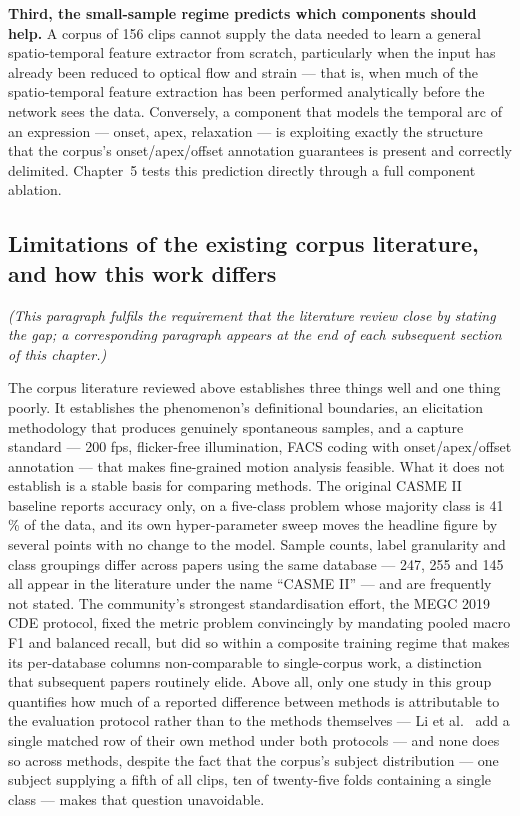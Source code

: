 \textbf{Third, the small-sample regime predicts which components should help.} A corpus of 156 clips cannot supply the data needed to learn a general spatio-temporal feature extractor from scratch, particularly when the input has already been reduced to optical flow and strain --- that is, when much of the spatio-temporal feature extraction has been performed analytically before the network sees the data. Conversely, a component that models the temporal arc of an expression --- onset, apex, relaxation --- is exploiting exactly the structure that the corpus's onset/apex/offset annotation guarantees is present and correctly delimited. Chapter~5 tests this prediction directly through a full component ablation.

\subsection{Limitations of the existing corpus literature, and how this work differs}
\label{sec:corpus-lit-limitations}

\textit{(This paragraph fulfils the requirement that the literature review close by stating the gap; a corresponding paragraph appears at the end of each subsequent section of this chapter.)}

The corpus literature reviewed above establishes three things well and one thing poorly. It establishes the phenomenon's definitional boundaries, an elicitation methodology that produces genuinely spontaneous samples, and a capture standard --- 200 fps, flicker-free illumination, FACS coding with onset/apex/offset annotation --- that makes fine-grained motion analysis feasible. What it does not establish is a stable basis for comparing methods. The original CASME II baseline reports accuracy only, on a five-class problem whose majority class is 41\,\% of the data, and its own hyper-parameter sweep moves the headline figure by several points with no change to the model. Sample counts, label granularity and class groupings differ across papers using the same database --- 247, 255 and 145 all appear in the literature under the name ``CASME II'' --- and are frequently not stated. The community's strongest standardisation effort, the MEGC 2019 CDE protocol, fixed the metric problem convincingly by mandating pooled macro F1 and balanced recall, but did so within a composite training regime that makes its per-database columns non-comparable to single-corpus work, a distinction that subsequent papers routinely elide. Above all, only one study in this group quantifies how much of a reported difference between methods is attributable to the evaluation protocol rather than to the methods themselves --- Li et al.~\cite{liX2018} add a single matched row of their own method under both protocols --- and none does so across methods, despite the fact that the corpus's subject distribution --- one subject supplying a fifth of all clips, ten of twenty-five folds containing a single class --- makes that question unavoidable.

